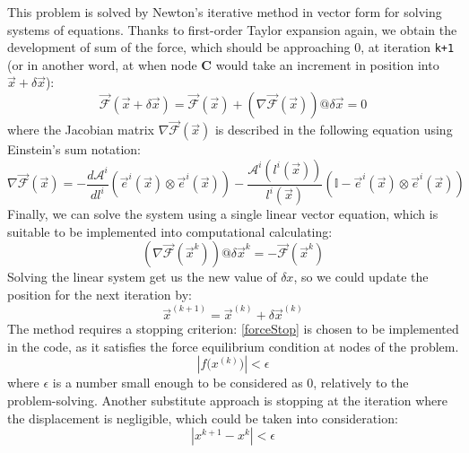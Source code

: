 \documentclass[a4paper,12pt]{article}
\numberwithin{equation}{section}
\theoremstyle{remark}
\begin{document}
 This problem is solved by Newton's iterative method in vector form for solving systems of equations.
Thanks to first-order Taylor expansion again, we obtain the development of sum of the force, which should be approaching 0, at iteration \texttt{k+1} (or in another word, at when node \textbf{C} would take an increment in position into $\vec{x}+ \delta \vec{x}$):
 \begin{equation}
  \vec{\mathcal{F}}(\vec{x}+ \delta \vec{x}) = \vec{\mathcal{F}}(\vec{x}) + \left(\nabla\vec{\mathcal{F}}(\vec{x})\right)@\delta \vec{x} = 0
  \label{TaylorK+1}
   \end{equation}
   where the Jacobian matrix $\nabla\vec{\mathcal{F}}(\vec{x})$ is described in the following equation using Einstein's sum notation:
   \begin{equation}
   \nabla\vec{\mathcal{F}}(\vec{x}) = -\dfrac{d\mathcal{A}^i}{dl^i}\left( \vec{e}^i(\vec{x}) \otimes \vec{e}^i(\vec{x}) \right) - \dfrac{\mathcal{A}^i\left(l^i(\vec{x})\right)}{l^i(\vec{x})} \left( \mathbb{I} - \vec{e}^i(\vec{x}) \otimes \vec{e}^i(\vec{x})\right)
  \label{Jacobian}
   \end{equation} 
      Finally, we can solve the system using a single linear vector equation, which is suitable to be implemented into computational calculating:
       \begin{equation}
\left(\nabla\vec{\mathcal{F}}(\vec{x}^k)\right)@\delta \vec{x}^k =  - \vec{\mathcal{F}}(\vec{x}^k)
  \label{finalConsole}
   \end{equation}
 Solving the linear system get us the new value of $\delta x$, so we could update the position for the next iteration by:
   \begin{equation}
 \vec{x}^{(k+1)} = \vec{x}^{(k)} + \delta \vec{x}^{(k)}
  \label{updatePosition}
 \end{equation}
 The method requires a stopping criterion: \cref{forceStop} is chosen to be implemented in the code, as it satisfies the force equilibrium condition at nodes of the problem.
 \begin{equation}
     \left| f\bigl(x^{(k)}\bigr) \right| < \epsilon
     \label{forceStop}
   \end{equation}
  where $\epsilon$ is a number small enough to be considered as 0, relatively to the problem-solving.
   Another substitute approach is stopping at the iteration where the displacement is negligible, which could be taken into consideration:
    \begin{equation}
     \left| x^{k+1} - x^k \right| < \epsilon
     \label{displacementStop}
   \end{equation}
\end{document}
